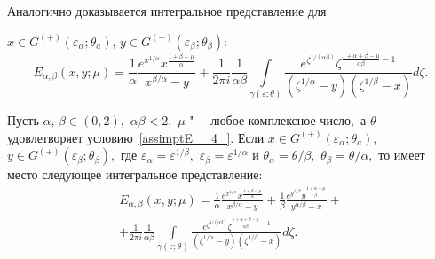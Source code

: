 Аналогично доказывается интегральное представление для {$x\in G^{(+)} (\varepsilon_\alpha; \theta_a)$,
$y\in G^{(-)} (\varepsilon _\beta  ;\theta _\beta )$:
\begin{equation}
\label{assimptE__13_}
E_{\alpha, \beta }  (x, y; \mu)=\frac{1}{\alpha } \frac{e^{x^{1/ \alpha}  } x^{\frac{1+\beta -\mu }{\alpha } } }{x^{\beta /\alpha} -y} +\frac{1}{2\pi i} \frac{1}{\alpha \beta } \int\limits_{\gamma (\varepsilon; \theta)}\frac{e^{\zeta ^{1/(\alpha \beta)} }   \zeta ^{\frac{1+\alpha +\beta -\mu }{\alpha \beta } -1} }{\left(\zeta ^{1/ \alpha}  -y\right)\left(\zeta ^{1/\beta} -x\right)} d \zeta .
\end{equation}


\smallskip

\begin{lemma}[3]
Пусть $\alpha,\,\beta \in (0, 2),$ $\alpha \beta <2,$ $\mu$ "---
любое комплексное число$,$ а $\theta$ удовлетворяет условию~\eqref{assimptE__4_}$.$
Если $x\in G^{(+)} (\varepsilon_\alpha; \theta_a),$
$y\in G^{(+)} (\varepsilon _\beta  ;\theta _\beta ),$
где $\varepsilon _{\alpha } =\varepsilon ^{1/\beta} ,$
$\varepsilon _{\beta } =\varepsilon ^{1/ \alpha} $ и
$\theta _{\alpha } =\theta/ \beta ,$ $\theta _{\beta } =\theta/ \alpha ,$
то имеет место следующее интегральное представление{\rm:}
\begin{multline}
\label{assimptE__15_}
E_{\alpha, \beta }  (x, y; \mu)=\frac{1}{\alpha } \frac{e^{x^{1/ \alpha}  } x^{\frac{1+\beta -\mu }{\alpha } } }{x^{\beta /\alpha} -y} +\frac{1}{\beta } \frac{e^{y^{1/\beta} } y^{\frac{1+\alpha -\mu }{\beta } } }{y^{\alpha/\beta}  -x} + \\ + \frac{1}{2\pi i} \frac{1}{\alpha \beta } \int\limits_{\gamma (\varepsilon; \theta)}\frac{e^{\zeta ^{1/(\alpha \beta)} }   \zeta ^{\frac{1+\alpha +\beta -\mu }{\alpha \beta } -1} }{\left(\zeta ^{1/ \alpha}  -y\right)\left(\zeta ^{1/\beta} -x\right)} d \zeta .
\end{multline}
\end{lemma}


}
